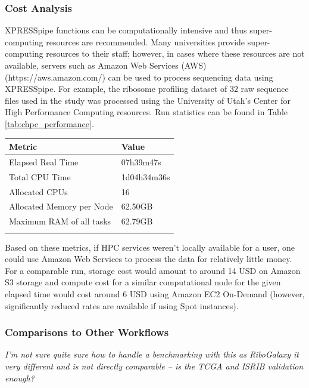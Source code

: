 \documentclass[11pt, a4paper, oneside]{article}
\begin{document}
\subsubsection{Cost Analysis}
XPRESSpipe functions can be computationally intensive and thus super-computing resources are recommended. Many universities provide super-computing resources to their staff; however, in cases where these resources are not available, servers such as Amazon Web Services (AWS) (https://aws.amazon.com/) can be used to process sequencing data using XPRESSpipe. For example, the ribosome profiling dataset of 32 raw sequence files used in the study was processed using the University of Utah's Center for High Performance Computing resources. Run statistics can be found in Table \ref{tab:chpc_performance}.

\begin{tabular}{p{5cm}p{3cm}}
\textbf{Metric} & \textbf{Value} \\
\hline
 Elapsed Real Time & 07h39m47s \\
 \hline
 Total CPU Time & 1d04h34m36s  \\
 \hline
 Allocated CPUs & 16 \\
 \hline
 Allocated Memory per Node & 62.50GB \\
 \hline
 Maximum RAM of all tasks & 62.79GB \\
 \label{tab:chpc_performance}
\end{tabular}
\newline

Based on these metrics, if HPC services weren't locally available for a user, one could use Amazon Web Services to process the data for relatively little money. For a comparable run, storage cost would amount to around 14 USD on Amazon S3 storage and compute cost for a similar computational node for the given elapsed time would cost around 6 USD using Amazon EC2 On-Demand (however, significantly reduced rates are available if using Spot instances).


\subsubsection{Comparisons to Other Workflows}
\textit{I'm not sure quite sure how to handle a benchmarking with this as RiboGalaxy it very different and is not directly comparable -- is the TCGA and ISRIB validation enough?}
\end{document}
